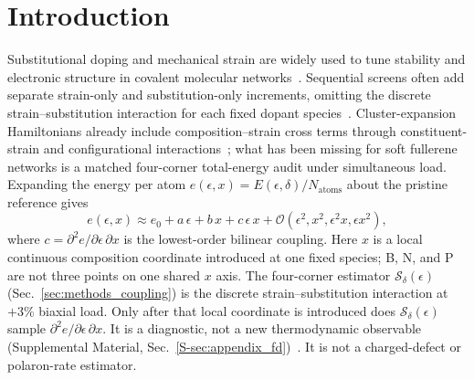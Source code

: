 \documentclass[%
 reprint,
 groupedaddress,
 amsmath,amssymb,
 aps,
 prb,
 floatfix,
]{revtex4-2}
\begin{document}
\begin{abstract}
Ionic relaxation of periodic $n{=}1$ P suppresses the constrained cross term to the reporting floor ($|\mathcal{S}_{\mathrm{relaxed}}|<10^{-3}$~meV/atom). On a separate tetramer boundary condition the same relaxation reverses the sign and increases $|\mathcal{S}|$ ($+1.19$ to $-2.28$~meV/atom). Rigid $|\mathcal{S}|$ is an upper-end protocol estimate relative to the fully relaxed fixed-cell protocol studied here, not a universal bound on every constraint manifold.
The audit signals when sequential additive workflows should be replaced by explicit coupled evaluations on the $E(\epsilon,\delta)$ landscape.
\end{abstract}

\maketitle

\section{\label{sec:intro}Introduction}

Substitutional doping and mechanical strain are widely used to tune stability and electronic structure in covalent molecular networks~\cite{Katiyar2025strain,Lv2026covalent}.
Sequential screens often add separate strain-only and substitution-only increments, omitting the discrete strain--substitution interaction for each fixed dopant species~\cite{Lee2023localised,Li2024strain,Katiyar2025strain}.
Cluster-expansion Hamiltonians already include composition--strain cross terms through constituent-strain and configurational interactions~\cite{Sanchez1984generalized,Laks1992efficient}; what has been missing for soft fullerene networks is a matched four-corner total-energy audit under simultaneous load.
Expanding the energy per atom $e(\epsilon,x)=E(\epsilon,\delta)/N_{\mathrm{atoms}}$ about the pristine reference gives
\begin{equation}
e(\epsilon,x) \approx e_{0} + a\,\epsilon + b\,x + c\,\epsilon\,x + \mathcal{O}(\epsilon^2,x^2,\epsilon^2 x,\epsilon x^2),
\label{eq:taylor_coupling}
\end{equation}
where $c=\partial^2 e/\partial\epsilon\,\partial x$ is the lowest-order bilinear coupling.
Here $x$ is a local continuous composition coordinate introduced at one fixed species; B, N, and P are not three points on one shared $x$ axis.
The four-corner estimator $\mathcal{S}_\delta(\epsilon)$ (Sec.~\ref{sec:methods_coupling}) is the discrete strain--substitution interaction at $+3$\% biaxial load.
Only after that local coordinate is introduced does $\mathcal{S}_\delta(\epsilon)$ sample $\partial^2 e/\partial\epsilon\,\partial x$.
It is a diagnostic, not a new thermodynamic observable (Supplemental Material, Sec.~\ref{S-sec:appendix_fd})~\cite{SupplementalMaterial}. It is not a charged-defect or polaron-rate estimator.
\end{document}
